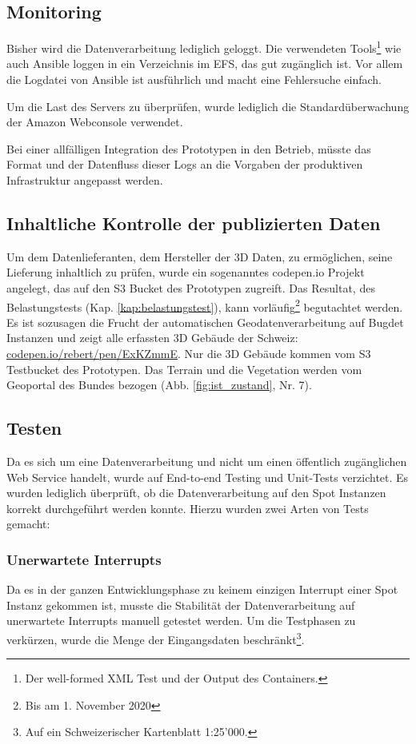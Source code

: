 \subsection{Monitoring}
Bisher wird die Datenverarbeitung lediglich geloggt. Die verwendeten Tools\footnote{Der well-formed XML Test und der Output des Containers.} wie auch Ansible loggen in ein Verzeichnis im EFS, das gut zugänglich ist. Vor allem die Logdatei von Ansible ist ausführlich und macht eine Fehlersuche einfach.

Um die Last des Servers zu überprüfen, wurde lediglich die Standardüberwachung der Amazon Webconsole verwendet.

Bei einer allfälligen Integration des Prototypen in den Betrieb, müsste das Format und der Datenfluss dieser Logs an die Vorgaben der produktiven Infrastruktur angepasst werden.


\subsection{Inhaltliche Kontrolle der publizierten Daten}\label{kap:inhaltlich}
Um dem Datenlieferanten, dem Hersteller der 3D Daten, zu ermöglichen, seine Lieferung inhaltlich zu prüfen, wurde ein sogenanntes codepen.io Projekt angelegt, das auf den S3 Bucket des Prototypen zugreift. Das Resultat, des Belastungstests (Kap. \ref{kap:belastungstest}), kann vorläufig\footnote{Bis am 1. November 2020} begutachtet werden. Es ist sozusagen die Frucht der automatischen Geodatenverarbeitung auf Bugdet Instanzen und zeigt alle erfassten 3D Gebäude der Schweiz:
\href{https://codepen.io/rebert/pen/ExKZmmE}{codepen.io/rebert/pen/ExKZmmE}. Nur die 3D Gebäude kommen vom S3 Testbucket des Prototypen. Das Terrain und die Vegetation werden vom Geoportal des Bundes bezogen (Abb. \ref{fig:ist_zustand}, Nr. 7).

\subsection{Testen}
Da es sich um eine Datenverarbeitung und nicht um einen öffentlich zugänglichen Web Service handelt, wurde auf End-to-end Testing und Unit-Tests verzichtet. Es wurden lediglich überprüft, ob die Datenverarbeitung auf den Spot Instanzen korrekt durchgeführt werden konnte. Hierzu wurden zwei Arten von Tests gemacht:

\subsubsection{Unerwartete Interrupts}
Da es in der ganzen Entwicklungsphase zu keinem einzigen Interrupt einer Spot Instanz gekommen ist, musste die Stabilität der Datenverarbeitung auf unerwartete Interrupts manuell getestet werden. Um die Testphasen zu verkürzen, wurde die Menge der Eingangsdaten beschränkt\footnote{Auf ein Schweizerischer Kartenblatt 1:25'000.}.

